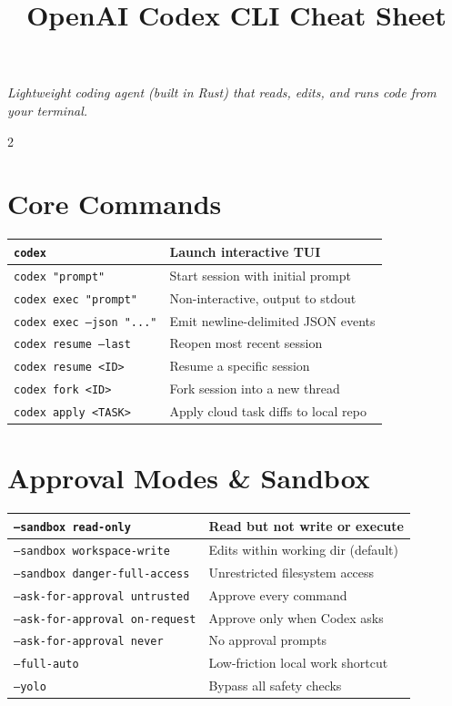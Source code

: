 \documentclass[a4paper, 9pt]{scrartcl}
\title{\vspace{-2cm}OpenAI Codex CLI Cheat Sheet}
\author{}
\date{}
\makeatletter
\newcommand{\cmdtable}[1]{%
  \smallskip
  \begin{tabularx}{\columnwidth}{@{}lX@{}}
  \toprule
  #1
  \bottomrule
  \end{tabularx}
  \smallskip
}
\makeatother
\begin{document}
\maketitle
\vspace{-2cm}

\begin{center}
\textit{Lightweight coding agent (built in Rust) that reads, edits, and runs code from your terminal.}
\end{center}

\vspace{0.5ex}

\begin{multicols}{2}

\section{Core Commands}

\cmdtable{
\texttt{codex} & Launch interactive TUI \\
\midrule
\texttt{codex "prompt"} & Start session with initial prompt \\
\midrule
\texttt{codex exec "prompt"} & Non-interactive, output to stdout \\
\midrule
\texttt{codex exec --json "..."} & Emit newline-delimited JSON events \\
\midrule
\texttt{codex resume --last} & Reopen most recent session \\
\midrule
\texttt{codex resume <ID>} & Resume a specific session \\
\midrule
\texttt{codex fork <ID>} & Fork session into a new thread \\
\midrule
\texttt{codex apply <TASK>} & Apply cloud task diffs to local repo \\
}

\section{Approval Modes \& Sandbox}

\cmdtable{
\texttt{--sandbox read-only} & Read but not write or execute \\
\midrule
\texttt{--sandbox workspace-write} & Edits within working dir (default) \\
\midrule
\texttt{--sandbox danger-full-access} & Unrestricted filesystem access \\
\midrule
\texttt{--ask-for-approval untrusted} & Approve every command \\
\midrule
\texttt{--ask-for-approval on-request} & Approve only when Codex asks \\
\midrule
\texttt{--ask-for-approval never} & No approval prompts \\
\midrule
\texttt{--full-auto} & Low-friction local work shortcut \\
\midrule
\texttt{--yolo} & Bypass all safety checks \\
}


\end{multicols}
\end{document}
